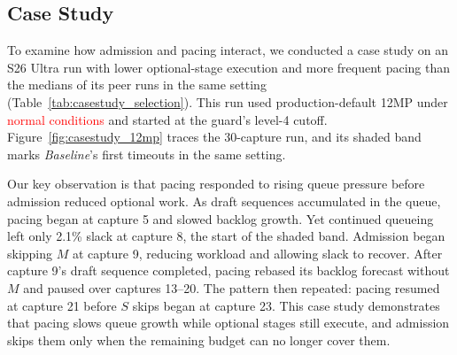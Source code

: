 \subsection{Case Study}
\label{sec:casestudy}




To examine how admission and pacing interact, we conducted a case study on an S26 Ultra run with lower optional-stage execution and more frequent pacing than the medians of its peer runs in the same setting (Table~\ref{tab:casestudy_selection}).
This run used production-default 12MP under \textcolor{red}{normal conditions} and started at the guard's level-4 cutoff.
Figure~\ref{fig:casestudy_12mp} traces the 30-capture run, and its shaded band marks \emph{Baseline}'s first timeouts in the same setting.

Our key observation is that pacing responded to rising queue pressure before admission reduced optional work.
As draft sequences accumulated in the queue, pacing began at capture 5 and slowed backlog growth.
Yet continued queueing left only 2.1\% slack at capture 8, the start of the shaded band.
Admission began skipping \(M\) at capture 9, reducing workload and allowing slack to recover.
After capture 9's draft sequence completed, pacing rebased its backlog forecast without \(M\) and paused over captures 13--20.
The pattern then repeated: pacing resumed at capture 21 before \(S\) skips began at capture 23.
This case study demonstrates that pacing slows queue growth while optional stages still execute, and admission skips them only when the remaining budget can no longer cover them.
